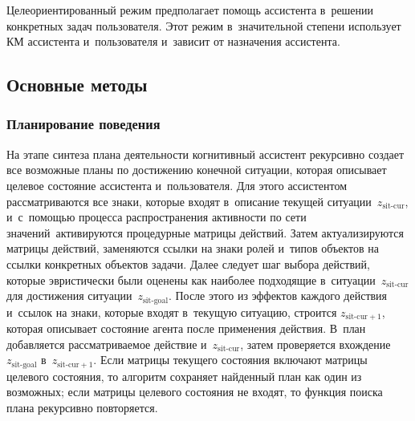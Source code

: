 \begin{multicols}{2}
  Целеориентированный режим предполагает помощь ассистента в~решении 
конкретных задач пользователя. Этот режим в~значительной степени 
использует КМ ассистента и~пользователя и~зависит от назначения 
ассистента.

  
  \subsection{Основные методы} %
  
  
  \subsubsection{Планирование поведения} %
  
  На этапе синтеза плана деятельности когнитивный ассистент рекурсивно 
создает все возможные планы по достижению конечной ситуации, которая 
описывает целевое состояние ассистента и~пользователя. Для этого ассистентом 
рассматриваются все знаки, которые входят в~описание текущей\linebreak 
ситуации~$z_{\mathrm{sit}\mbox{-}\mathrm{cur}}$, и~с~по\-мощью процесса распространения 
активности по сети значений~\cite{3-sm, 5-sm}\linebreak активируются процедурные 
матрицы действий. Затем актуализируются матрицы действий, заменяются 
ссылки на знаки ролей и~типов объектов на ссылки конкретных объектов 
задачи. Далее следует шаг выбора действий, которые эвристически были 
оценены как наиболее подходящие в~ситуации~$z_{\mathrm{sit}\mbox{-}\mathrm{cur}}$ для 
достижения ситуации~$z_{\mathrm{sit}\mbox{-}\mathrm{goal}}$. После этого из эффектов каждого 
действия и~ссылок на знаки, которые входят в~текущую ситуацию, строится 
$z_{\mathrm{sit}\mbox{-}\mathrm{cur}+1}$, которая описывает состояние агента после применения 
действия. В~план добавляется рассматриваемое действие  
и~$z_{\mathrm{sit}\mbox{-}\mathrm{cur}}$, затем проверяется
 вхождение~$z_{\mathrm{sit}\mbox{-}\mathrm{goal}}$ 
в~$z_{\mathrm{sit}\mbox{-}\mathrm{cur}+1}$. Если матрицы текущего состояния включают 
матрицы целевого состояния, то алгоритм сохраняет найденный план как один 
из возможных; если мат\-ри\-цы целевого со\-сто\-яния
не входят, то функция поиска плана рекурсивно 
повторяется.

  
  

\end{multicols}

